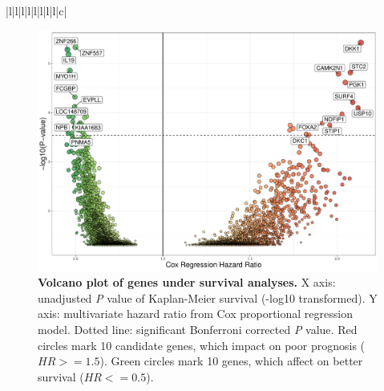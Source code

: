 \documentclass[jpm,article,submit,moreauthors,pdftex]{Definitions/mdpi}
\newcommand{\bcaption}[2]{\caption{\textbf{#1} #2}}
\begin{document}
\begin{table}[hp]
{\begin{tabular}{|l|l|l|l|l|l|l|l|c|}
                                                                                                                                                                                                                 \\
\hline
\end{tabular}
}
\label{table:table3}
\end{table}




\begin{figure}[hp]
\centering
\includegraphics[width=14cm]{TCGA_HNSC_Optimal_Overall_allPlot_unKM_P_multiHR-Figure3.pdf} %
\bcaption{Volcano plot of genes under survival analyses.}
{X axis: unadjusted \textit{P} value of Kaplan-Meier survival (-log10 transformed).
Y axis: multivariate hazard ratio from Cox proportional regression model.
Dotted line: significant Bonferroni corrected \textit{P} value. 
Red circles mark 10 candidate genes, which impact on poor prognosis ($HR>=1.5$). Green circles mark 10 genes, which affect on better survival ($HR<=0.5$).}
\label{fig:figure3}
\end{figure}
\end{document}
